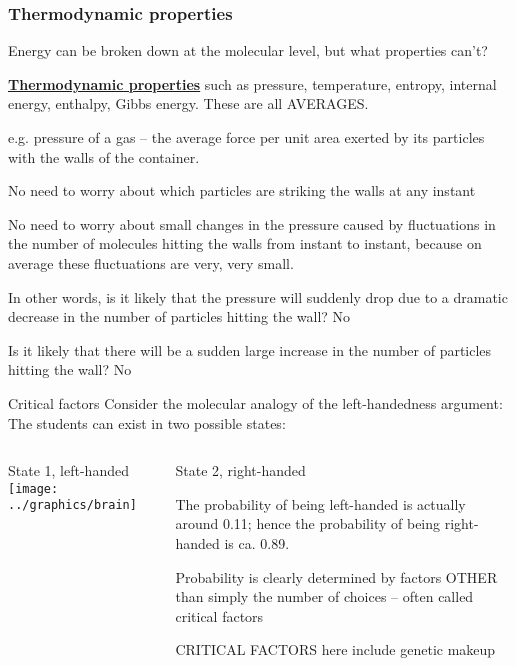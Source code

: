 \documentclass[ignorenonframetext]{beamer}
\begin{document}
\begin{frame}[allowframebreaks=0.8]
\frametitle{Thermodynamic properties}
Energy can be broken down at the molecular level, but what properties can't?\newline

\underline{\textbf{Thermodynamic properties}} such as pressure, temperature, entropy, internal energy, enthalpy, Gibbs energy. These are all AVERAGES.

e.g. pressure of a gas -- the average force per unit area exerted by its particles with the walls of the container. \newline

No need to worry about which particles are striking the walls at any instant \newline

No need to worry about small changes in the pressure caused by fluctuations in the number of molecules hitting the walls from instant to instant, because on average these fluctuations are very, very small. \newline

In other words, is it likely that the pressure will suddenly drop due to a dramatic decrease in the number of particles hitting the wall? No \newline

Is it likely that there will be a sudden large increase in the number of particles hitting the wall? No
\end{frame}

\begin{frame}{Critical factors}
Consider the molecular analogy of the left-handedness argument:\\ The students can exist in two possible states: \newline

\begin{columns}[onlytextwidth]
\begin{column}{.4\textwidth}
State 1, left-handed
	\texttt{[image: ../graphics/brain]}
\end{column}
\begin{column}{.6\textwidth}
State 2, right-handed\newline

The probability of being left-handed is actually around 0.11; hence the probability of being right-handed is ca. 0.89.\par
Probability is clearly determined by factors OTHER than simply the number of choices -- often called critical factors\par
CRITICAL FACTORS here include genetic makeup
\end{column}
\end{columns}
\end{frame}
\end{document}
